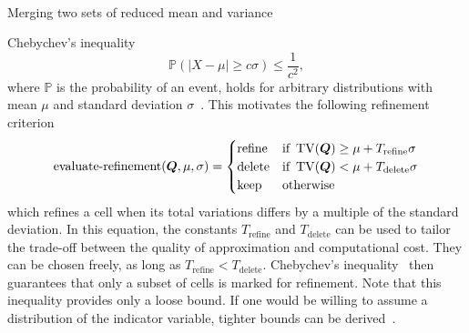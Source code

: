 \begin{algorithm}[tb]
  \begin{algorithmic}
  \State{}
\EndIf\
  \State{}
\EndIf\
  \Let{$m_b$}{$\variance_1 (\gobsCount_1 - 1)$}
  \State\Return{$
    \nicefrac{\mean_\Sigma}{\gobsCount_\Sigma},
    \nicefrac{m_\text{total}}{\gobsCount_\Sigma - 1},
    \gobsCount_\Sigma
    $}
\EndFunction\
  \end{algorithmic}
  \caption{\label{alg:merge-variance}
    Merging two sets of reduced mean and variance~\cite{chan1982updating}}
\end{algorithm}
Chebychev's inequality
\begin{equation}
  \label{eq:chebychev}
  \mathbb{P}(\vert X - \mu \vert \geq c \sigma) \leq \frac{1}{c^2},
\end{equation}
where $\mathbb{P}$ is the probability of an event,
holds for arbitrary distributions with mean $\mu$ and standard deviation $\sigma$~\cite{wasserman2004all}.
This motivates the following refinement criterion
\begin{equation}
  \label{eq:refinement-criterion}
  \operatorname{evaluate-refinement}(\bm{Q}, \mu, \sigma) =
  \begin{cases}
    \text{refine} & \text{if } \operatorname{TV}(\bm{Q}) \geq \mu + T_\text{refine} \sigma \\
    \text{delete} & \text{if } \operatorname{TV}(\bm{Q}) < \mu + T_\text{delete} \sigma \\
    \text{keep} & \text{otherwise}
    \end{cases}
\end{equation}
which refines a cell when its total variations differs by a multiple of the standard deviation.
In this equation, the constants $T_\text{refine}$ and $T_\text{delete}$ can be used to tailor the trade-off between the quality of approximation and computational cost.
They can be chosen freely, as long as $T_\text{refine} < T_\text{delete}$.
Chebychev's inequality~\pcref{eq:chebychev} then guarantees that only a subset of cells is marked for refinement.
Note that this inequality provides only a loose bound.
If one would be willing to assume a distribution of the indicator variable, tighter bounds can be derived~\cite{wasserman2004all}.

